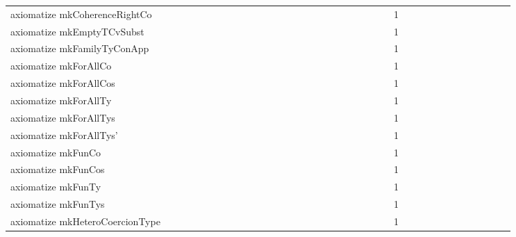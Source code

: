 {\begin{tabular}{l|rrr|rrr|rrr}
axiomatize mkCoherenceRightCo &  &  &  &  &  &  &  &  &  &  &  &  &  &  &  &  &  &  &  &  &  &  &  & 1 &  &  &  &  &  &  &  &  &  &  &  & \\
axiomatize mkEmptyTCvSubst &  &  &  &  &  &  &  &  &  &  &  &  &  &  &  &  &  &  &  &  &  &  &  & 1 &  &  &  &  &  &  &  &  &  &  &  & \\
axiomatize mkFamilyTyConApp &  &  &  &  &  &  &  &  &  &  &  &  &  &  &  &  &  &  &  &  &  &  &  & 1 &  &  &  &  &  &  &  &  &  &  &  & \\
axiomatize mkForAllCo &  &  &  &  &  &  &  &  &  &  &  &  &  &  &  &  &  &  &  &  &  &  &  & 1 &  &  &  &  &  &  &  &  &  &  &  & \\
axiomatize mkForAllCos &  &  &  &  &  &  &  &  &  &  &  &  &  &  &  &  &  &  &  &  &  &  &  & 1 &  &  &  &  &  &  &  &  &  &  &  & \\
axiomatize mkForAllTy &  &  &  &  &  &  &  &  &  &  &  &  &  &  &  &  &  &  &  &  &  &  &  & 1 &  &  &  &  &  &  &  &  &  &  &  & \\
axiomatize mkForAllTys &  &  &  &  &  &  &  &  &  &  &  &  &  &  &  &  &  &  &  &  &  &  &  & 1 &  &  &  &  &  &  &  &  &  &  &  & \\
axiomatize mkForAllTys' &  &  &  &  &  &  &  &  &  &  &  &  &  &  &  &  &  &  &  &  &  &  &  & 1 &  &  &  &  &  &  &  &  &  &  &  & \\
axiomatize mkFunCo &  &  &  &  &  &  &  &  &  &  &  &  &  &  &  &  &  &  &  &  &  &  &  & 1 &  &  &  &  &  &  &  &  &  &  &  & \\
axiomatize mkFunCos &  &  &  &  &  &  &  &  &  &  &  &  &  &  &  &  &  &  &  &  &  &  &  & 1 &  &  &  &  &  &  &  &  &  &  &  & \\
axiomatize mkFunTy &  &  &  &  &  &  &  &  &  &  &  &  &  &  &  &  &  &  &  &  &  &  &  & 1 &  &  &  &  &  &  &  &  &  &  &  & \\
axiomatize mkFunTys &  &  &  &  &  &  &  &  &  &  &  &  &  &  &  &  &  &  &  &  &  &  &  & 1 &  &  &  &  &  &  &  &  &  &  &  & \\
axiomatize mkHeteroCoercionType &  &  &  &  &  &  &  &  &  &  &  &  &  &  &  &  &  &  &  &  &  &  &  & 1 &  &  &  &  &  &  &  &  &  &  &  & \\

\end{tabular}}
